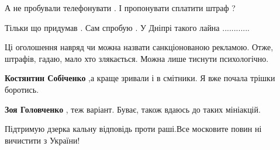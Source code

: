 \begin{itemize}
\begin{itemize}
\end{itemize}

 
А не пробували телефонувати . І пропонувати сплатити штраф ?

Тільки що придумав . Сам спробую . У Дніпрі такого лайна ............

 

Ці оголошення навряд чи можна назвати санкціонованою рекламою. Отже, штрафів,
гадаю, мало хто злякається. Можна лише тиснути психологічно.

\begin{itemize}
 
\textbf{Костянтин Собіченко} ,а краще зривали і в смітники. Я вже почала трішки боротись.

\begin{itemize}
 
\textbf{Зоя Головченко} , теж варіант. Буває, також вдаюсь до таких мініакцій.
\end{itemize}

\end{itemize}

 
Підтримую дзерка
кальну відповідь
проти раші.Все
московите повин
ні вичистити з України!


\end{itemize}
